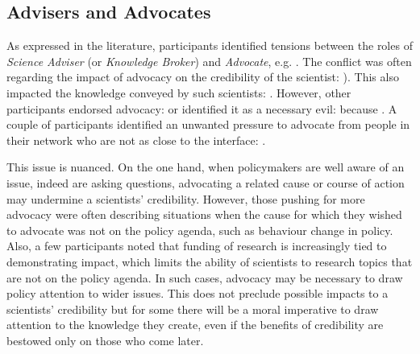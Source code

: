 \subsection{Advisers and Advocates}\label{sec:disadvocacy}

As expressed in the literature, participants identified tensions between the roles of \emph{Science Adviser} (or \emph{Knowledge Broker}) and \emph{Advocate}, e.g. . The conflict was often regarding the impact of advocacy on the credibility of the scientist: ). This also impacted the knowledge conveyed by such scientists: . However, other participants endorsed advocacy:  or identified it as a necessary evil:  because . A couple of participants identified an unwanted pressure to advocate from people in their network who are not as close to the interface: .

This issue is nuanced. On the one hand, when policymakers are well aware of an issue, indeed are asking questions, advocating a related cause or course of action may undermine a scientists' credibility. However, those pushing for more advocacy were often describing situations when the cause for which they wished to advocate was not on the policy agenda, such as behaviour change in \CAN{} policy. Also, a few participants noted that funding of research is increasingly tied to demonstrating impact, which limits the ability of scientists to research topics that are not on the policy agenda. In such cases, advocacy may be necessary to draw policy attention to wider issues. This does not preclude possible impacts to a scientists' credibility but for some there will be a moral imperative to draw attention to the knowledge they create, even if the benefits of credibility are bestowed only on those who come later. 

